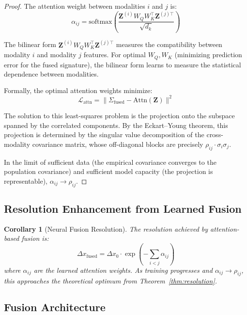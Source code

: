 \documentclass[11pt,a4paper]{article}
\newtheorem{corollary}[theorem]{Corollary}
\theoremstyle{definition}
\theoremstyle{remark}
\newcommand{\Sig}{\Sigma}
\newcommand{\loss}{\mathcal{L}}
\begin{document}
\begin{proof}
The attention weight between modalities $i$ and $j$ is:
\begin{equation}
\alpha_{ij} = \text{softmax}\left(\frac{\mathbf{Z}^{(i)} W_Q W_K^\top \mathbf{Z}^{(j)\top}}{\sqrt{d_k}}\right)
\end{equation}

The bilinear form $\mathbf{Z}^{(i)} W_Q W_K^\top \mathbf{Z}^{(j)\top}$ measures the compatibility between modality $i$ and modality $j$ features. For optimal $W_Q, W_K$ (minimizing prediction error for the fused signature), the bilinear form learns to measure the statistical dependence between modalities.

Formally, the optimal attention weights minimize:
\begin{equation}
\loss_{\text{attn}} = \|\Sig_{\text{fused}} - \text{Attn}(\mathbf{Z})\|^2
\end{equation}

The solution to this least-squares problem is the projection onto the subspace spanned by the correlated components. By the Eckart--Young theorem, this projection is determined by the singular value decomposition of the cross-modality covariance matrix, whose off-diagonal blocks are precisely $\rho_{ij} \cdot \sigma_i \sigma_j$.

In the limit of sufficient data (the empirical covariance converges to the population covariance) and sufficient model capacity (the projection is representable), $\alpha_{ij} \to \rho_{ij}$.
\end{proof}

\subsection{Resolution Enhancement from Learned Fusion}

\begin{corollary}[Neural Fusion Resolution]
The resolution achieved by attention-based fusion is:
\begin{equation}
\Delta x_{\text{fused}} = \Delta x_0 \cdot \exp\left(-\sum_{i<j} \alpha_{ij}\right)
\end{equation}
where $\alpha_{ij}$ are the learned attention weights. As training progresses and $\alpha_{ij} \to \rho_{ij}$, this approaches the theoretical optimum from Theorem~\ref{thm:resolution}.
\end{corollary}

\subsection{Fusion Architecture}
\end{document}
